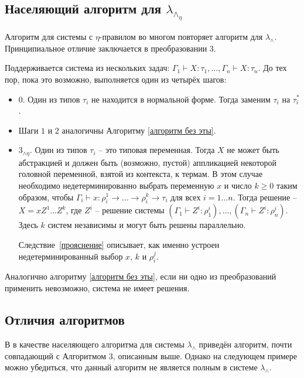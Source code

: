 \documentclass{spbau-diploma}
\begin{document}
\subsection{Населяющий алгоритм для $\lambda_\wedge_\eta$}

Алгоритм для системы с $\eta$-правилом во многом повторяет алгоритм для $\lambda_\wedge$. Принципиальное отличие заключается в преобразовании $3$.
\begin{algorithm} \label{alg} 
Поддерживается система из нескольких задач: $\Gamma_1 \vdash X : \tau_1 ,\dots, \Gamma_n \vdash X : \tau_n$. До тех пор, пока это возможно, выполняется один из четырёх шагов: 

\begin{itemize}

     \item $0$. Один из типов $\tau_i$ не находится в нормальной форме. Тогда заменим $\tau_i$ на $\tau_i^*$.
     \item Шаги $1$ и $2$ аналогичны Алгоритму \ref{алгоритм без эты}.
     
     \item $3_{\wedge \eta}$. Один из типов $\tau_i$ -- это типовая переменная. Тогда $X$ не может быть абстракцией и должен быть (возможно, пустой) аппликацией некоторой головной переменной, взятой из контекста, к термам. В этом случае необходимо недетерминированно выбрать переменную $x$ и число $k \geqslant 0$ таким образом, чтобы  $\Gamma_i \vdash x : \rho_i^1 \to \dots \to \rho_i^k \to \tau_i$ для всех $i = 1 \dots n$. Тогда решение --  $X = x Z^1 \dots Z^k$, где $Z^i$ -- решение системы $(\Gamma_1 \vdash Z^i : \rho_1^i) ,\dots, (\Gamma_n \vdash Z^i : \rho_n^i)$. Здесь $k$ систем независимы и могут быть решены параллельно.
     
     Следствие~\ref{прояснение} описывает, как именно устроен недетерминированный выбор $x$, $k$ и $\rho_i^j$.
     
\end{itemize}

Аналогично алгоритму \ref{алгоритм без эты}, если ни одно из преобразований применить невозможно, система не имеет решения. 

\end{algorithm}

\subsection{Отличия алгоритмов}

В \cite{kusmierek_07} в качестве населяющего алгоритма для системы $\lambda_\wedge$ приведён алгоритм, почти совпадающий с Алгоритмом 3, описанным выше. Однако на следующем примере можно убедиться, что данный алгоритм не является полным в системе $\lambda_\wedge$.
\end{document}
